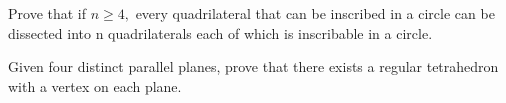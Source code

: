 \item Prove that if $n \geq 4,$ every quadrilateral that can be inscribed in a circle can be dissected into n quadrilaterals each of which is inscribable in a circle.
\item Given four distinct parallel planes, prove that there exists a regular tetrahedron with a vertex on each plane.


